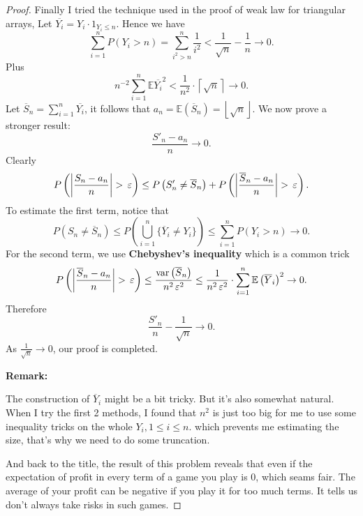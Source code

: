 \begin{proof}
		Finally I tried the technique used in the proof of weak law for triangular arrays, 
		Let $\overline{Y_{i}}= Y_{i} \cdot 1_{Y_{i} \le  n}$. Hence we have 
		\[
				\sum_{i=1}^{n} P\left( Y_{i} > n \right) = 
				\sum_{i^2 > n}^{n} \frac{1}{i^2} < \frac{1}{\sqrt{n} } - \frac{1}{n}
				\to  0
		.\]
		Plus 
		\[
		n^{-2} \sum_{i=1}^{n} \mathbb{E} \overline{Y_i}^2 < 
		\frac{1}{n^2} \cdot \left\lceil \sqrt{n}  \right\rceil \to  0 
		.\] 
		Let $\overline{S}_n = \sum_{i=1}^{n} \overline{Y_i}$, it follows 
		that $a_n = \mathbb{E} \left( \overline{S}_n \right) = \left\lfloor \sqrt{n}  \right\rfloor$. We now prove a stronger result: 
		\[
				\frac{ S'_n -a_n }{n} \to  0  
		.\] 
		Clearly
		\[
				P\left( \left| \frac{S_n-a_n}{n} \right| > \,\varepsilon \right) \le 
				P\left( S'_n \neq \overline{S}_n \right) + 
				P \left( \left| \frac{\overline{S}_n-a_n}{n} \right| > \,\varepsilon  \right) 
		.\] 
		To estimate the first term, notice that 
		\[
				P\left( S_n \neq \overline{S}_n \right) \le  
				P \left( \bigcup_{i=1}^{n} \{ \overline{Y}_i\neq Y_i\}   \right) 
				\le \sum_{i=1}^{n} P\left( Y_i > n \right) \to 0
		.\] 
		For the second term, we use \textbf{Chebyshev's inequality} which is a 
		common trick
		\[
				P \left( \left| \frac{\overline{S}_n-a_n}{n} \right| > \,\varepsilon  \right) 
				\le  \frac{ \mathrm{var}\left( \overline{S}_n \right)   }{ n^2\,\varepsilon^2}
				\le \frac{1}{n^2\,\varepsilon^2} \cdot \sum_{i=1}^{n} \mathbb{E} \left( \overline{Y}_i \right) ^2 \to 0
		.\] 
		Therefore 
		\[
				\frac{S'_n }{n} - \frac{1}{\sqrt{n} } \to 0 
		.\] 
		As $\frac{1}{\sqrt{n} }\to 0$, our proof is completed.

		\noindent \textbf{Remark:}

		The construction of $\overline{Y}_i$ might be a bit tricky. But it's also somewhat natural. When I try the first 2 methods, I found that $n^2$ is just too big for 
		me to use some inequality tricks on the whole $Y_i,1\le i\le n$. 
		which prevents me estimating the size, that's why we need to do some truncation.

		And back to the title, the result of this problem reveals that even if the 
		expectation of profit in every term of a game you play is 0, which seams 
		fair. The average of your profit
		can be negative if you play it for too much terms. It tells us don't always take 
		risks in such games.
\end{proof}


